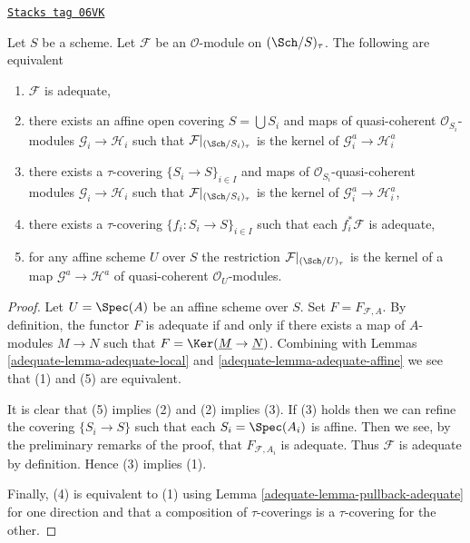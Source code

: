 \begin{lemma}
\label{adequate-lemma-adequate-characterize}
\href{https://stacks.math.columbia.edu/tag/06VK}{\texttt{Stacks tag 06VK}}

Let $S$ be a scheme. Let $\mathcal{F}$ be an $\mathcal{O}$-module on
$(\Sch/S)_\tau$. The following are equivalent
\begin{enumerate}
\item $\mathcal{F}$ is adequate,
\item there exists an affine open covering $S = \bigcup S_i$ and
maps of quasi-coherent $\mathcal{O}_{S_i}$-modules
$\mathcal{G}_i \to \mathcal{H}_i$
such that $\mathcal{F}|_{(\Sch/S_i)_\tau}$ is the
kernel of $\mathcal{G}_i^a \to \mathcal{H}_i^a$
\item there exists a $\tau$-covering $\{S_i \to S\}_{i \in I}$ and
maps of $\mathcal{O}_{S_i}$-quasi-coherent modules
$\mathcal{G}_i \to \mathcal{H}_i$
such that $\mathcal{F}|_{(\Sch/S_i)_\tau}$ is the
kernel of $\mathcal{G}_i^a \to \mathcal{H}_i^a$,
\item there exists a $\tau$-covering $\{f_i : S_i \to S\}_{i \in I}$
such that each $f_i^*\mathcal{F}$ is adequate,
\item for any affine scheme $U$ over $S$ the restriction
$\mathcal{F}|_{(\Sch/U)_\tau}$ is the kernel
of a map $\mathcal{G}^a \to \mathcal{H}^a$ of quasi-coherent
$\mathcal{O}_U$-modules.
\end{enumerate}
\end{lemma}

\begin{proof}

Let $U = \Spec(A)$ be an affine scheme over $S$.
Set $F = F_{\mathcal{F}, A}$. By definition, the functor
$F$ is adequate if and only if there exists a map of $A$-modules
$M \to N$ such that $F = \Ker(\underline{M} \to \underline{N})$.
Combining with
Lemmas \ref{adequate-lemma-adequate-local} and
\ref{adequate-lemma-adequate-affine}
we see that (1) and (5) are equivalent.

\medskip\noindent
It is clear that (5) implies (2) and (2) implies (3).
If (3) holds then we can refine the covering
$\{S_i \to S\}$ such that each $S_i = \Spec(A_i)$ is affine.
Then we see, by the preliminary remarks of the proof, that
$F_{\mathcal{F}, A_i}$ is adequate. Thus $\mathcal{F}$
is adequate by definition. Hence (3) implies (1).

\medskip\noindent
Finally, (4) is equivalent to (1) using
Lemma \ref{adequate-lemma-pullback-adequate}
for one direction and that
a composition of $\tau$-coverings is a $\tau$-covering for the other.
\end{proof}

